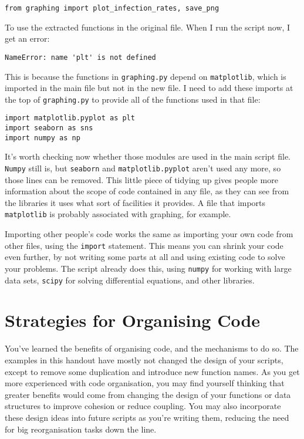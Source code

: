 \documentclass[a4paper]{article}
\begin{document}
\begin{verbatim}
from graphing import plot_infection_rates, save_png
\end{verbatim}

To use the extracted functions in the original file. When I run the script now, I get an error:

\begin{verbatim}
NameError: name 'plt' is not defined
\end{verbatim}

This is because the functions in \texttt{graphing.py} depend on \texttt{matplotlib}, which is imported in the main file but not in the new file.
I need to add these imports at the top of \texttt{graphing.py} to provide all of the functions used in that file:

\begin{verbatim}
import matplotlib.pyplot as plt
import seaborn as sns
import numpy as np
\end{verbatim}

It's worth checking now whether those modules are used in the main script file.
\texttt{Numpy} still is, but \texttt{seaborn} and \texttt{matplotlib.pyplot} aren't used any more, so those lines can be removed.
This little piece of tidying up gives people more information about the scope of code contained in any file, as they can see from the libraries it uses what sort of facilities it provides.
A file that imports \texttt{matplotlib} is probably associated with graphing, for example.

Importing other people's code works the same as importing your own code from other files, using the \texttt{import} statement.
This means you can shrink your code even further, by not writing some parts at all and using existing code to solve your problems.
The script already does this, using \texttt{numpy} for working with large data sets, \texttt{scipy} for solving differential equations, and other libraries.

\section{Strategies for Organising Code}
You've learned the benefits of organising code, and the mechanisms to do so.
The examples in this handout have mostly not changed the design of your scripts, except to remove some duplication and introduce new function names.
As you get more experienced with code organisation, you may find yourself thinking that greater benefits would come from changing the design of your functions or data structures to improve cohesion or reduce coupling.
You may also incorporate these design ideas into future scripts as you're writing them, reducing the need for big reorganisation tasks down the line.
\end{document}

